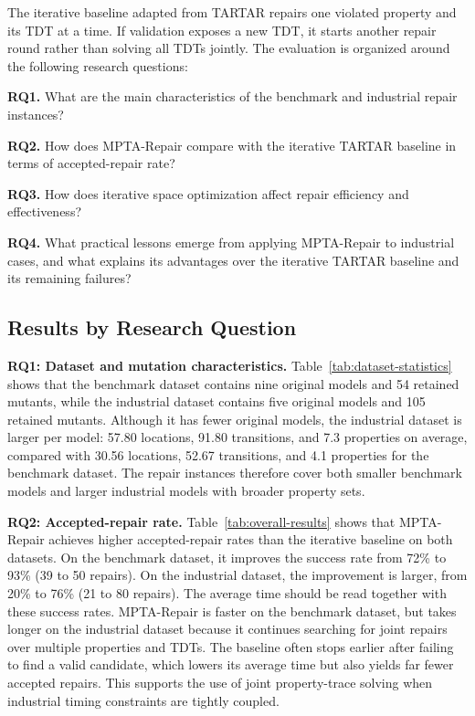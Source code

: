 The iterative baseline adapted from TARTAR \cite{kolbl2019clock}
repairs one violated property and its TDT at a time. If validation
exposes a new TDT, it starts another repair round rather than solving
all TDTs jointly.
The evaluation is organized around the following research questions:

\noindent\textbf{RQ1.} What are the main characteristics of the
benchmark and industrial repair instances?

\noindent\textbf{RQ2.} How does MPTA-Repair compare with the iterative
TARTAR baseline in terms of accepted-repair rate?

\noindent\textbf{RQ3.} How does iterative space optimization affect
repair efficiency and effectiveness?

\noindent\textbf{RQ4.} What practical lessons emerge from applying
MPTA-Repair to industrial cases, and what explains its advantages over
the iterative TARTAR baseline and its remaining failures?

\subsection{Results by Research Question}

\noindent\textbf{RQ1: Dataset and mutation characteristics.}
Table~\ref{tab:dataset-statistics} shows that the benchmark dataset
contains nine original models and 54 retained mutants, while the
industrial dataset contains five original models and 105 retained
mutants. Although it has fewer original models, the industrial dataset
is larger per model: 57.80 locations, 91.80 transitions, and 7.3
properties on average, compared with 30.56 locations, 52.67
transitions, and 4.1 properties for the benchmark dataset. The repair
instances therefore cover both smaller benchmark models and larger
industrial models with broader property sets.



\noindent\textbf{RQ2: Accepted-repair rate.}
Table~\ref{tab:overall-results} shows that MPTA-Repair achieves higher
accepted-repair rates than the iterative baseline on both datasets. On
the benchmark dataset, it improves the success rate from 72\% to 93\%
(39 to 50 repairs). On the industrial dataset, the improvement is larger,
from 20\% to 76\% (21 to 80 repairs). The average time should be read
together with these success rates. MPTA-Repair is faster on the
benchmark dataset, but takes longer on the industrial dataset because it
continues searching for joint repairs over multiple properties and TDTs.
The baseline often stops earlier after failing to find a valid
candidate, which lowers its average time but also yields far fewer
accepted repairs. This supports the use of joint property-trace solving
when industrial timing constraints are tightly coupled.

